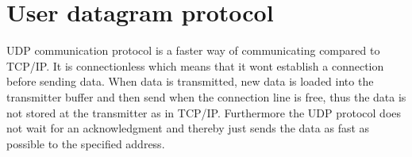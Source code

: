 \section{User datagram protocol}
\gls{UDP} communication protocol is a faster way of communicating compared to TCP/IP\cite{TCP_IP_UDP}. It is connectionless which means that it wont establish a connection before sending data. When data is transmitted, new data is loaded into the transmitter buffer and then send when the connection line is free, thus the data is not stored at the transmitter as in TCP/IP. Furthermore the \gls{UDP} protocol does not wait for an acknowledgment and thereby just sends the data as fast as possible to the specified address.

